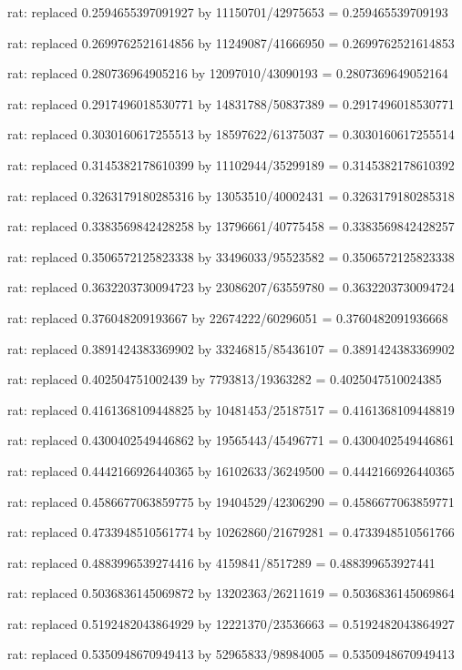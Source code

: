 \documentclass[a4paper,10pt]{article}
\begin{document}
\begin{eulernotebook}
\begin{eulercomment}
\begin{eulercomment}
\begin{eulercomment}
\begin{eulercomment}
\begin{eulercomment}
\begin{eulercomment}
\begin{eulercomment}
\begin{eulercomment}
\begin{eulercomment}
\begin{eulercomment}
\begin{eulercomment}
\begin{eulercomment}
\begin{eulercomment}
\begin{eulercomment}
\begin{eulercomment}
\begin{eulercomment}
\begin{euleroutput}
  rat: replaced 0.2594655397091927 by 11150701/42975653 = 0.259465539709193
  
  rat: replaced 0.2699762521614856 by 11249087/41666950 = 0.2699762521614853
  
  rat: replaced 0.280736964905216 by 12097010/43090193 = 0.2807369649052164
  
  rat: replaced 0.2917496018530771 by 14831788/50837389 = 0.2917496018530771
  
  rat: replaced 0.3030160617255513 by 18597622/61375037 = 0.3030160617255514
  
  rat: replaced 0.3145382178610399 by 11102944/35299189 = 0.3145382178610392
  
  rat: replaced 0.3263179180285316 by 13053510/40002431 = 0.3263179180285318
  
  rat: replaced 0.3383569842428258 by 13796661/40775458 = 0.3383569842428257
  
  rat: replaced 0.3506572125823338 by 33496033/95523582 = 0.3506572125823338
  
  rat: replaced 0.3632203730094723 by 23086207/63559780 = 0.3632203730094724
  
  rat: replaced 0.376048209193667 by 22674222/60296051 = 0.3760482091936668
  
  rat: replaced 0.3891424383369902 by 33246815/85436107 = 0.3891424383369902
  
  rat: replaced 0.402504751002439 by 7793813/19363282 = 0.4025047510024385
  
  rat: replaced 0.4161368109448825 by 10481453/25187517 = 0.4161368109448819
  
  rat: replaced 0.4300402549446862 by 19565443/45496771 = 0.4300402549446861
  
  rat: replaced 0.4442166926440365 by 16102633/36249500 = 0.4442166926440365
  
  rat: replaced 0.4586677063859775 by 19404529/42306290 = 0.4586677063859771
  
  rat: replaced 0.4733948510561774 by 10262860/21679281 = 0.4733948510561766
  
  rat: replaced 0.4883996539274416 by 4159841/8517289 = 0.488399653927441
  
  rat: replaced 0.5036836145069872 by 13202363/26211619 = 0.5036836145069864
  
  rat: replaced 0.5192482043864929 by 12221370/23536663 = 0.5192482043864927
  
  rat: replaced 0.5350948670949413 by 52965833/98984005 = 0.5350948670949413
  

\end{euleroutput}
\end{eulercomment}
\end{eulercomment}
\end{eulercomment}
\end{eulercomment}
\end{eulercomment}
\end{eulercomment}
\end{eulercomment}
\end{eulercomment}
\end{eulercomment}
\end{eulercomment}
\end{eulercomment}
\end{eulercomment}
\end{eulercomment}
\end{eulercomment}
\end{eulercomment}
\end{eulercomment}
\end{eulernotebook}
\end{document}
